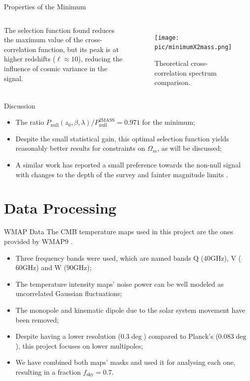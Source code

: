 \documentclass[serif, aspectratio=169]{beamer}
\begin{document}
\begin{frame}{Properties of the Minimum}
    \begin{columns}
        The selection function found reduces the maximum value of the cross-correlation function, but its peak is at higher redshifts ($\ell\approx 10$), reducing the influence of cosmic variance in the signal.
        
        \begin{figure}
            \centering
            \texttt{[image: pic/minimumX2mass.png]}
            \caption{Theoretical cross-correlation spectrum comparison.}
            \label{fig:minimum_cross_corr}
        \end{figure}
    \end{columns}
\end{frame}

\begin{frame}{Discussion}
    \begin{itemize}
        \item The ratio $P_\text{null}(z_0,\beta, \lambda)/P_\text{null}^\text{2MASS}=0.971$ for the minimum;
        \item Despite the small statistical gain, this optimal selection function yields reasonably better results for constraints on $\Omega_m$, as will be discussed;
        \item A similar work has reported a small preference towards the non-null signal with changes to the depth of the survey and fainter magnitude limits \cite{simillar_ISW_analysis}.
    \end{itemize}
\end{frame}

\section{Data Processing}

\begin{frame}{WMAP Data}
The CMB temperature maps used in this project are the ones provided by WMAP9 \cite{wmap_supplement}.

\begin{itemize}
	\item Three frequency bands were used, which are named bands Q ($40\text{GHz}$), V ($60\text{GHz}$) and W ($90\text{GHz}$);
	\item The temperature intensity maps' noise power can be well modeled as uncorrelated Gaussian fluctuations;
	\item The monopole and kinematic dipole due to the solar system movement have been removed;
	\item Despite having a lower resolution ($0.3\deg$) compared to Planck's ($0.083\deg$), this project focuses on lower multipoles;
	\item We have combined both maps' masks and used it for analysing each one, resulting in a fraction $f_\text{sky}=0.7$.
\end{itemize}
\end{frame}
\end{document}
